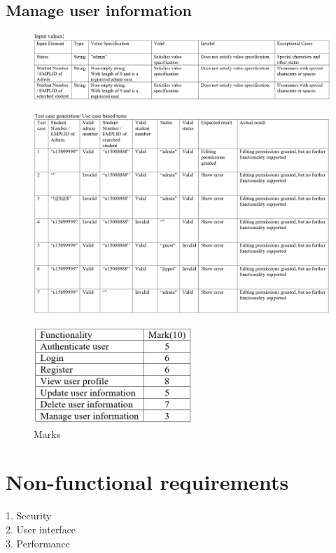 \documentclass[english]{article}
\begin{document}
\subsection{Manage user information}
\begin{figure}[ht!]
\hspace*{-2.5cm}
\includegraphics[width=180mm]{13.png}
\end{figure}
\begin{figure}[ht!]
\hspace*{-2.5cm}
\includegraphics[width=180mm]{14.png}
\end{figure}
\clearpage
\begin{figure}[ht!]
\center
\includegraphics[width=60mm]{Marks.png}
\caption{Marks}
\end{figure}
\section{Non-functional requirements}
1.	Security\\
2.	User interface\\
3.	Performance\\
\end{document}
